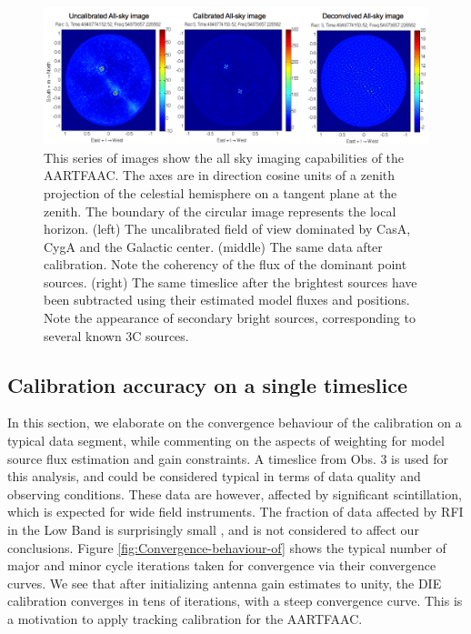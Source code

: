 \documentclass{aa}
\begin{document}
\begin{figure}[tbh]
\includegraphics[width=0.9\paperwidth]{Figs/uncal_cal_deconv_night.png}

\caption{\label{fig:uncal_cal_deconv_night} This  series of images  show the all
  sky imaging  capabilities of  the AARTFAAC. The  axes are in  direction cosine
  units of a zenith projection of the celestial hemisphere on a tangent plane at
  the  zenith.   The  boundary  of  the  circular  image  represents  the  local
  horizon. (left) The uncalibrated field of view dominated by CasA, CygA and the
  Galactic center. (middle) The same  data after calibration. Note the coherency
  of the flux  of the dominant point sources.  (right)  The same timeslice after
  the brightest sources have been  subtracted using their estimated model fluxes
  and positions.  Note the appearance of secondary bright sources, corresponding
  to several known 3C sources.}
\end{figure}


\subsection{\label{sec:calib-accuracy}Calibration accuracy on a single timeslice}

In this section, we elaborate on the convergence behaviour of the calibration on
a typical data  segment, while commenting on the aspects  of weighting for model
source flux estimation  and gain constraints.  A timeslice from  Obs.  3 is used
for this analysis, and could be  considered typical in terms of data quality and
observing  conditions.    These  data  are  however,   affected  by  significant
scintillation, which  is expected  for wide field  instruments. The  fraction of
data    affected    by    RFI     in    the    Low    Band    is    surprisingly
small \citep{offringa2012lofar},   and   is   not   considered  to   affect   our
conclusions. Figure \ref{fig:Convergence-behaviour-of}  shows the typical number
of major and minor cycle  iterations taken for convergence via their convergence
curves. We see that after initializing antenna gain estimates to unity, the
DIE  calibration  converges in  tens  of  iterations,  with a  steep  convergence
curve. This is a motivation to apply tracking calibration for the AARTFAAC.
\end{document}
